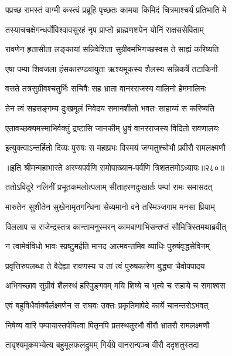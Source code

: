 \twolineshloka
{पप्रच्छ रामस्तं वाग्मी कस्त्वं प्रब्रूहि पृच्छतः}
{कामया किमिदं चित्रमाश्चर्यं प्रतिभाति मे}


\twolineshloka
{तस्याचचक्षेगन्धर्वोविश्वावसुरहं नृप}
{प्राप्तो ब्राह्मणशपेन योनिं राक्षससेविताम्}


\twolineshloka
{रावणेन हृतासीता लङ्कायां सन्निवेशिता}
{सुग्रीवमभिगच्छस्वस ते साह्यं करिष्यति}


\twolineshloka
{एषा पम्पा शिवजला हंसकारण्डवायुता}
{ऋश्यमूकस्य शैलस्य सन्निकर्षे तटाकिनी}


\twolineshloka
{वसते तत्रसुग्रीवश्चतुर्भिः सचिवैः सह}
{भ्राता वानरराजस्य वालिनो हेममालिनः}


\twolineshloka
{तेन त्वं सहसङ्गम्य दुःखमूलं निवेदय}
{समानशीलो भवतः साहाय्यं स करिष्यति}


\twolineshloka
{एतावच्छक्यमस्माभिर्वक्तुं द्रष्टासि जानकीम्}
{ध्रुवं वानरराजस्य विदितो रावणालयः}


\twolineshloka
{इत्युक्त्वाऽन्तर्हितो दिव्यः पुरुषः स महाप्रभः}
{विस्मयं जग्मतुश्चोभौ प्रवीरौ रामलक्ष्मणौ}


॥इति श्रीमन्महाभारते अरण्यपर्वणि रामोपाख्यान-पर्वणि त्रिशततमोऽध्यायः॥२८०॥

\storymeta

\resetShloka



\twolineshloka
{ततोऽविदूरे नलिनीं प्रभूतकमलोत्पलाम्}
{सीताहरणदुःखार्तः पम्पां रामः समासदत्}


\twolineshloka
{मारुतेन सुशीतेन सुखेनामृतगन्धिना}
{सेव्यमानो वने तस्मिञ्जगाम मनसा प्रियाम्}


\twolineshloka
{विललाप स राजेन्द्रस्तत्र कान्तामनुस्मरन्}
{कामबाणाभिसन्तप्तं सौमित्रिस्तमथाब्रवीत्}


\twolineshloka
{न त्वामेवंविधो भावः स्प्रष्टुमर्हति मानद}
{आत्मवन्तमिव व्याधिः पुरुषंवृद्धसेविनम्}


\twolineshloka
{प्रवृत्तिरुपलब्धा ते वैदेह्या रावणस्य च}
{तां त्वं पुरुषकारेण बुद्ध्या चैवोपपादय}


\twolineshloka
{अभिगच्छाव सुग्रीवं शैलस्थं हरिपुङ्गवम्}
{मयि शिष्ये च भृत्ये च सहाये च समाश्वस}


\twolineshloka
{एवं बहुविधैर्वाक्यैर्लक्ष्मणेन स राघवः}
{उक्तः प्रकृतिमापेदे कार्ये चानन्तरोऽभवत्}


\twolineshloka
{निषेव्य वारि पम्पायास्तर्पयित्वा पितृनपि}
{प्रतस्थतुरभौ वीरौ भ्रातरौ रामलक्ष्मणौ}


\twolineshloka
{तावृश्यमूकमभ्येत्य बहुमूलफलद्रुमम्}
{गिर्यग्रे वानरान्पञ्च वीरौ ददृशतुस्तदा}


